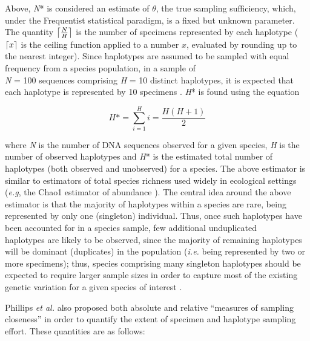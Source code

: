 \vspace{5mm}

Above, \textit{N}* is considered an estimate of $\theta$, the true sampling sufficiency, which, under the Frequentist statistical paradigm, is a fixed but unknown parameter. The quantity $\ceil*{\frac{N}{H}}$ is the number of specimens represented by each haplotype ($\ceil{x}$ is the ceiling function applied to a number $x$, evaluated by rounding up to the nearest integer). Since haplotypes are assumed to be sampled with equal frequency from a species population, in a sample of \\ \textit{N} = 100 sequences comprising \textit{H} = 10 distinct haplotypes, it is expected that each haplotype is represented by 10 specimens \cite{phillips2015exploration}. \textit{H}* is found using the equation

\begin{equation}
H\mbox{*}=\sum_{i=1}^H i = \frac{H(H+1)}{2}
\label{eqn}
\end{equation}

\vspace{1mm}

\noindent where \textit{N} is the number of DNA sequences observed for a given species, \textit{H} is the number of observed haplotypes and \textit{H}* is the estimated total number of haplotypes (both observed and unobserved) for a species. The above estimator is similar to estimators of total species richness used widely in ecological settings (\textit{e.g}, the Chao1 estimator of abundance \cite{chao1984nonparametric}). The central idea around the above estimator is that the majority of haplotypes within a species are rare, being represented by only one (singleton) individual. Thus, once such haplotypes have been accounted for in a species sample, few additional unduplicated \\ haplotypes are likely to be observed, since the majority of remaining haplotypes will be dominant (duplicates) in the population (\textit{i.e.} being represented by two or more specimens); thus, species comprising many singleton haplotypes should be expected to require larger sample sizes in order to capture most of the existing genetic variation for a given species of interest \cite{phillips2015exploration, williams2016early}.

\vspace{5mm}
  
Phillips \textit{et al.} \cite{phillips2015exploration} also proposed both absolute and relative ``measures of sampling closeness'' in order to quantify the extent of specimen and haplotype sampling effort. These quantities are as follows:

